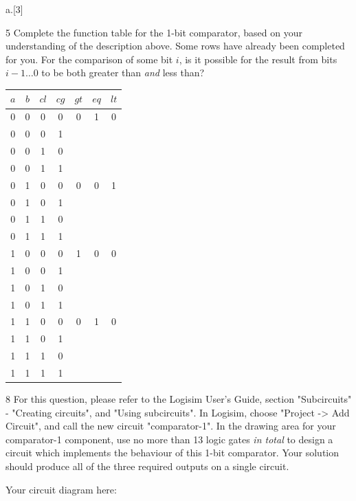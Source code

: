 \begin{question}{a.}[3]
  \item[5] Complete the function table for the 1-bit comparator, based on your understanding of the description above. Some rows have already been completed for you. For the comparison of some bit $i$, is it possible for the result from bits $i-1 \ldots 0$ to be both greater than \textit{and} less than?
  
  \begin{tabular}{c c c c | c c c}
    $a$ & $b$ & $cl$ & $cg$ & $gt$ & $eq$ & $lt$ \\
    \hline
    0 & 0 & 0 & 0 & 0 & 1 & 0 \\
    0 & 0 & 0 & 1 &  &  &  \\
    0 & 0 & 1 & 0 &  &  &  \\
    0 & 0 & 1 & 1 &  &  &  \\
    \hline
    0 & 1 & 0 & 0 & 0 & 0 & 1 \\
    0 & 1 & 0 & 1 &  &  &  \\
    0 & 1 & 1 & 0 &  &  &  \\
    0 & 1 & 1 & 1 &  &  &  \\
    \hline
    1 & 0 & 0 & 0 & 1 & 0 & 0 \\
    1 & 0 & 0 & 1 &  &  &  \\
    1 & 0 & 1 & 0 &  &  &  \\
    1 & 0 & 1 & 1 &  &  &  \\
    \hline
    1 & 1 & 0 & 0 & 0 & 1 & 0 \\
    1 & 1 & 0 & 1 &  &  &  \\
    1 & 1 & 1 & 0 &  &  &  \\
    1 & 1 & 1 & 1 &  &  &  \\
  \end{tabular}
  
  \newpage
  
  \item[8] For this question, please refer to the Logisim User's Guide, section "Subcircuits" - "Creating circuits", and "Using subcircuits". In Logisim, choose "Project -> Add Circuit", and call the new circuit "comparator-1". In the drawing area for your comparator-1 component, use no more than 13 logic gates \textit{in total} to design a circuit which implements the behaviour of this 1-bit comparator. Your solution should produce all of the three required outputs on a single circuit.
  
  Your circuit diagram here:
  
  \vspace{10.0cm}
  

\end{question}
